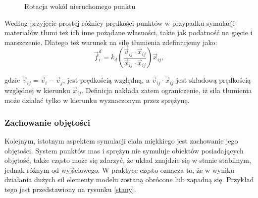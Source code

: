 \begin{figure}[ht]
\centering

\caption{Rotacja wokół nieruchomego punktu}
\label{tlumienie}
\end{figure}

Według \cite{pbdo} przyjęcie prostej różnicy prędkości punktów w przypadku
symulacji materiałów tłumi też ich inne pożądane własności, takie jak podatność na gięcie
i marszczenie. Dlatego też warunek na siłę tłumienia zdefiniujemy jako:
\begin{equation}
\vec{f}^{d}_i = k_d (\frac{\vec{v}_{ij} \cdot
		\vec{x}_{ij}}{\vec{x}_{ij} \cdot \vec{x}_{ij}}) \vec{x}_{ij},
\end{equation}

gdzie $\vec{v}_{ij} = \vec{v}_i - \vec{v}_j$, jest prędkością względną, a $\vec{v}_{ij} \cdot \vec{x}_{ij}$ jest 
składową prędkością względnej w kierunku $\vec{x}_{ij}$. Definicja nakłada zatem
ograniczenie, iż siła tłumienia może działać tylko w kierunku wyznaczonym przez
sprężynę.

\subsubsection{Zachowanie objętości}
Kolejnym, istotnym aspektem symulacji ciała miękkiego jest zachowanie jego
objętości. System punktów mas i sprężyn nie symuluje obiektów posiadających
objętość, także często może się zdarzyć, że układ znajdzie się w stanie
stabilnym, jednak różnym od wyjściowego. W praktyce często oznacza to, że w
wyniku działania dużych sił elementy modelu zostaną obrócone lub zapadną się.
Przykład tego jest przedstawiony na rysunku \ref{stany}.

